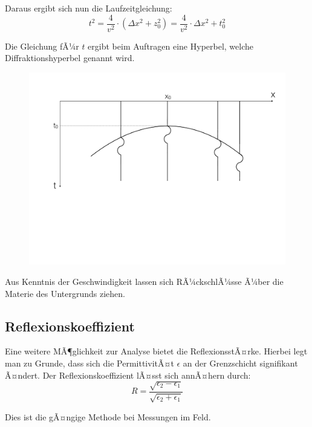 Daraus ergibt sich nun die Laufzeitgleichung: \begin{equation*}
	t^2 = \frac{4}{v^2} \cdot (\Delta x^2 + z_0^2) = \frac{4}{v^2} \cdot \Delta x^2 + t_0^2
\end{equation*}

Die Gleichung fÃ¼r $t$ ergibt beim Auftragen eine Hyperbel, welche Diffraktionshyperbel genannt wird. 


\begin{figure}[H]
	\centering
	\includegraphics[width = \textwidth]{GeoradarBilder/Radargramm}
\end{figure}

Aus Kenntnis der Geschwindigkeit lassen sich RÃ¼ckschlÃ¼sse Ã¼ber die Materie des Untergrunds ziehen.


\subsection{Reflexionskoeffizient}
Eine weitere MÃ¶glichkeit zur Analyse bietet die ReflexionsstÃ¤rke. Hierbei legt man zu Grunde, dass sich die PermittivitÃ¤t $\epsilon$ an der Grenzschicht signifikant Ã¤ndert. Der Reflexionskoeffizient lÃ¤sst sich annÃ¤hern durch: \begin{equation*}
	R = \frac{\sqrt{\epsilon_2 - \epsilon_1}}{\sqrt{\epsilon_2 + \epsilon_1}}
\end{equation*}

Dies ist die gÃ¤ngige Methode bei Messungen im Feld.














